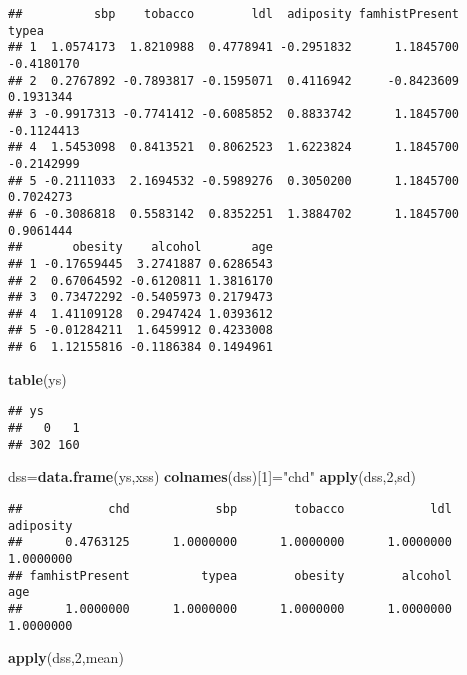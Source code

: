 \documentclass[
]{article}
\newenvironment{Shaded}{\begin{snugshade}}{\end{snugshade}}
\newcommand{\DecValTok}[1]{\textcolor[rgb]{0.00,0.00,0.81}{#1}}
\newcommand{\KeywordTok}[1]{\textcolor[rgb]{0.13,0.29,0.53}{\textbf{#1}}}
\newcommand{\NormalTok}[1]{#1}
\newcommand{\StringTok}[1]{\textcolor[rgb]{0.31,0.60,0.02}{#1}}
\begin{document}
\begin{verbatim}
##          sbp    tobacco        ldl  adiposity famhistPresent      typea
## 1  1.0574173  1.8210988  0.4778941 -0.2951832      1.1845700 -0.4180170
## 2  0.2767892 -0.7893817 -0.1595071  0.4116942     -0.8423609  0.1931344
## 3 -0.9917313 -0.7741412 -0.6085852  0.8833742      1.1845700 -0.1124413
## 4  1.5453098  0.8413521  0.8062523  1.6223824      1.1845700 -0.2142999
## 5 -0.2111033  2.1694532 -0.5989276  0.3050200      1.1845700  0.7024273
## 6 -0.3086818  0.5583142  0.8352251  1.3884702      1.1845700  0.9061444
##       obesity    alcohol       age
## 1 -0.17659445  3.2741887 0.6286543
## 2  0.67064592 -0.6120811 1.3816170
## 3  0.73472292 -0.5405973 0.2179473
## 4  1.41109128  0.2947424 1.0393612
## 5 -0.01284211  1.6459912 0.4233008
## 6  1.12155816 -0.1186384 0.1494961
\end{verbatim}

\begin{Shaded}
\begin{Highlighting}[]
\KeywordTok{table}\NormalTok{(ys)}
\end{Highlighting}
\end{Shaded}

\begin{verbatim}
## ys
##   0   1 
## 302 160
\end{verbatim}

\begin{Shaded}
\begin{Highlighting}[]
\NormalTok{dss=}\KeywordTok{data.frame}\NormalTok{(ys,xss)}
\KeywordTok{colnames}\NormalTok{(dss)[}\DecValTok{1}\NormalTok{]=}\StringTok{"chd"}
\KeywordTok{apply}\NormalTok{(dss,}\DecValTok{2}\NormalTok{,sd)}
\end{Highlighting}
\end{Shaded}

\begin{verbatim}
##            chd            sbp        tobacco            ldl      adiposity 
##      0.4763125      1.0000000      1.0000000      1.0000000      1.0000000 
## famhistPresent          typea        obesity        alcohol            age 
##      1.0000000      1.0000000      1.0000000      1.0000000      1.0000000
\end{verbatim}

\begin{Shaded}
\begin{Highlighting}[]
\KeywordTok{apply}\NormalTok{(dss,}\DecValTok{2}\NormalTok{,mean)}
\end{Highlighting}
\end{Shaded}
\end{document}
